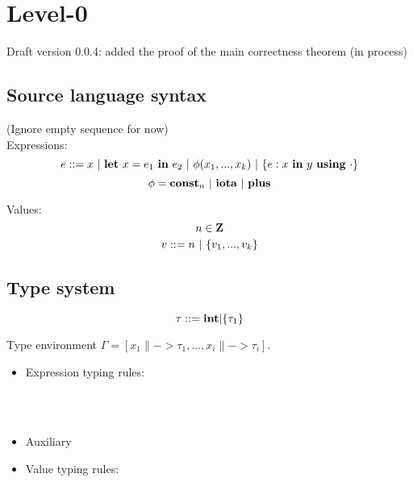 \newcommand{\eq}[2]{\begin{equation}\label{#1} #2\end{equation}}

\providecommand{\versionnumber}{0.0.4}


\section{Level-0}

Draft version \versionnumber: added the proof of the main correctness theorem (in process)

\subsection{Source language syntax}
(Ignore empty sequence for now)\\
Expressions:
$$e ::= x \ | \ \Let{x}{e_1}{e_2} \ | \ \hcall{\Tupk{x}} \ | \ \Comp{e}{x}{y}{\cdot} $$
$$\phi = \mathbf{const}_n \ | \ \mathbf{iota} \ | \ \mathbf{plus} $$ 

Values: \\
$$ n \in \mathbf{Z} $$
$$ v::= n \ | \ \{ v_1,...,v_k \}$$

\subsection{Type system}
$$\tau ::= \mathbf{int} | \{\tau_1\}$$

Type environment $\Gamma = [x_1 \|-> \tau_1, ..., x_i \|-> {\tau_i} ]$.
\begin{itemize}

\item Expression typing rules:\\


\\[1ex]


\\[2ex]


\item Auxiliary \Jug{\Type{}{\TypeF} {\Tupk{\tau} \-> \tau}}


\item Value typing rules: \\



\end{itemize}

